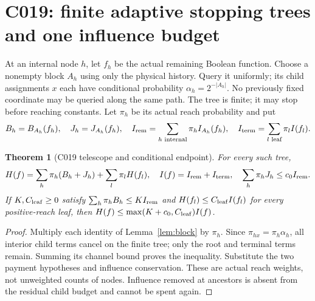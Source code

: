 \documentclass[11pt]{article}
\newtheorem{theorem}[lemma]{Theorem}
\begin{document}
\section{C019: finite adaptive stopping trees and one influence budget}
At an internal node $h$, let $f_h$ be the actual remaining Boolean
function. Choose a nonempty block $A_h$ using only the physical
history. Query it uniformly; its child assignments $x$ each have
conditional probability $\alpha_h=2^{-|A_h|}$.
No previously fixed coordinate may be queried along the same path.
The tree is finite; it may stop before reaching constants.
Let $\pi_h$ be its actual reach probability and put
\[
B_h=B_{A_h}(f_h),\quad J_h=J_{A_h}(f_h),\quad
I_{\rm rem}=\sum_{h\text{ internal}}\pi_h I_{A_h}(f_h),\quad
I_{\rm term}=\sum_{l\text{ leaf}}\pi_l I(f_l).
\]
\begin{theorem}[C019 telescope and conditional endpoint]
\label{thm:tree}
For every such tree,
\[
H(f)=\sum_h\pi_h(B_h+J_h)+\sum_l\pi_lH(f_l),\quad
I(f)=I_{\rm rem}+I_{\rm term},\quad
\sum_h\pi_hJ_h\le c_0 I_{\rm rem}.
\]
If $K,C_{\rm leaf}\ge0$ satisfy
$\sum_h\pi_hB_h\le K I_{\rm rem}$ and
$H(f_l)\le C_{\rm leaf} I(f_l)$ for every positive-reach leaf,
then $H(f)\le\max(K+c_0,C_{\rm leaf})I(f)$.
\end{theorem}
\begin{proof}
Multiply each identity of Lemma~\ref{lem:block} by $\pi_h$.
Since $\pi_{hx}=\pi_h\alpha_h$, all interior child terms cancel
on the finite tree; only the root and terminal terms remain.
Summing its channel bound proves the inequality. Substitute the
two payment hypotheses and influence conservation. These are actual
reach weights, not unweighted counts of nodes. Influence removed at
ancestors is absent from the residual child budget and cannot be
spent again.
\end{proof}
\end{document}
